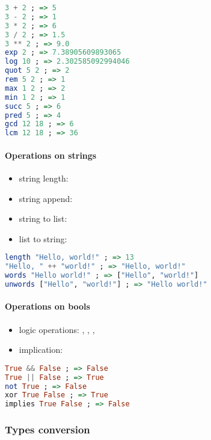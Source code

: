 \documentclass[a4paper,landscape,10pt]{article}
\begin{document}
\begin{multicols*}{2}
  \begin{lstlisting}[language=Haskell]
3 + 2 ; => 5
3 - 2 ; => 1
3 * 2 ; => 6
3 / 2 ; => 1.5
3 ** 2 ; => 9.0
exp 2 ; => 7.38905609893065
log 10 ; => 2.302585092994046
quot 5 2 ; => 2
rem 5 2 ; => 1
max 1 2 ; => 2
min 1 2 ; => 1
succ 5 ; => 6
pred 5 ; => 4
gcd 12 18 ; => 6
lcm 12 18 ; => 36
\end{lstlisting}

  \paragraph{Operations on strings}

  \begin{itemize}
    \item string length: 
    \item string append: \ihaskell{++}
    \item string to list: 
    \item list to string: 
  \end{itemize}

  \begin{lstlisting}[language=Haskell]
length "Hello, world!" ; => 13
"Hello, " ++ "world!" ; => "Hello, world!"
words "Hello world!" ; => ["Hello", "world!"]
unwords ["Hello", "world!"] ; => "Hello world!"
\end{lstlisting}

  \paragraph{Operations on bools}

  \begin{itemize}
    \item logic operations: \ihaskell{&&}, \ihaskell{||}, , 
    \item implication: 
  \end{itemize}

  \begin{lstlisting}[language=Haskell]
True && False ; => False
True || False ; => True
not True ; => False
xor True False ; => True
implies True False ; => False
\end{lstlisting}

  \subsubsection{Types conversion}


\end{multicols*}
\end{document}
